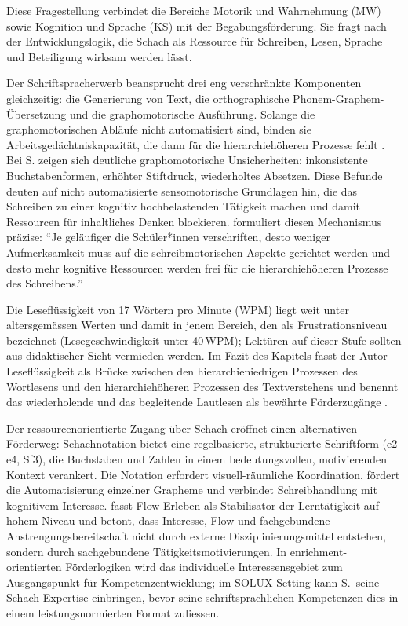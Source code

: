 \documentclass[ngerman, a4paper]{article}
\begin{document}
Diese Fragestellung verbindet die Bereiche Motorik und Wahrnehmung (MW) sowie
Kognition und Sprache (KS) mit der Begabungsförderung. Sie fragt nach der
Entwicklungslogik, die Schach als Ressource für Schreiben, Lesen, Sprache und
Beteiligung wirksam werden lässt.

Der Schriftspracherwerb beansprucht drei eng verschränkte
Komponenten gleichzeitig: die Generierung von Text, die
orthographische Phonem-Graphem-Übersetzung und die graphomotorische
Ausführung. Solange die graphomotorischen Abläufe nicht
automatisiert sind, binden sie Arbeitsgedächtniskapazität, die
dann für die hierarchiehöheren Prozesse fehlt
\parencite[S.\,125,\,130]{nottbusch2017graphomotorik}. Bei S. zeigen sich deutliche
graphomotorische Unsicherheiten: inkonsistente Buchstabenformen, erhöhter Stiftdruck,
wiederholtes Absetzen. Diese Befunde deuten auf nicht automatisierte sensomotorische
Grundlagen hin, die das Schreiben zu einer kognitiv hochbelastenden Tätigkeit machen
und damit Ressourcen für inhaltliches Denken blockieren.
\textcite[S.\,3]{hurschler2020handschriftbeurteilung} formuliert diesen
Mechanismus präzise: \enquote{Je geläufiger die Schüler*innen verschriften, desto
  weniger Aufmerksamkeit muss auf die schreibmotorischen Aspekte gerichtet werden
  und desto mehr kognitive Ressourcen werden frei für die hierarchiehöheren
  Prozesse des Schreibens.}

Die Leseflüssigkeit von 17 Wörtern pro Minute (WPM) liegt weit unter
altersgemässen Werten und damit in jenem Bereich, den
\textcite[S.\,70]{gold2018lesenkannmanlernen} als Frustrationsniveau
bezeichnet (Lesegeschwindigkeit unter 40\,WPM); Lektüren auf dieser
Stufe sollten aus didaktischer Sicht vermieden werden. Im Fazit des
Kapitels fasst der Autor Leseflüssigkeit als Brücke zwischen den
hierarchieniedrigen Prozessen des Wortlesens und den hierarchiehöheren
Prozessen des Textverstehens und benennt das wiederholende und das
begleitende Lautlesen als bewährte Förderzugänge
\parencite[S.\,88]{gold2018lesenkannmanlernen}.

Der ressourcenorientierte Zugang über Schach eröffnet einen alternativen
Förderweg: Schachnotation bietet eine regelbasierte, strukturierte Schriftform
(e2-e4, Sf3), die Buchstaben und Zahlen in einem bedeutungsvollen, motivierenden
Kontext verankert. Die Notation erfordert visuell-räumliche Koordination, fördert
die Automatisierung einzelner Grapheme und verbindet Schreibhandlung mit
kognitivem Interesse. \textcite[S.\,89]{lehwald2017motivation} fasst Flow-Erleben
als Stabilisator der Lerntätigkeit auf hohem Niveau und betont, dass Interesse,
Flow und fachgebundene Anstrengungsbereitschaft nicht durch externe
Disziplinierungsmittel entstehen, sondern durch sachgebundene
Tätigkeitsmotivierungen. In enrichment-orientierten Förderlogiken wird
das individuelle Interessensgebiet zum Ausgangspunkt für Kompetenzentwicklung;
im SOLUX-Setting kann S.\ seine Schach-Expertise einbringen, bevor seine
schriftsprachlichen Kompetenzen dies in einem leistungsnormierten Format
zuliessen.
\end{document}
